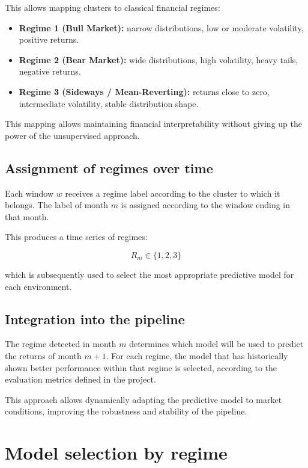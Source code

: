 \documentclass[12pt]{article}
\begin{document}
This allows mapping clusters to classical financial regimes:

\begin{itemize}
    \item \textbf{Regime 1 (Bull Market):} narrow distributions, low or moderate volatility, positive returns.
    \item \textbf{Regime 2 (Bear Market):} wide distributions, high volatility, heavy tails, negative returns.
    \item \textbf{Regime 3 (Sideways / Mean-Reverting):} returns close to zero, intermediate volatility, stable distribution shape.
\end{itemize}

This mapping allows maintaining financial interpretability without giving up the power of the unsupervised approach.

\subsection{Assignment of regimes over time}

Each window $w$ receives a regime label according to the cluster to which it belongs.  
The label of month $m$ is assigned according to the window ending in that month.

This produces a time series of regimes:



\[
R_m \in \{1, 2, 3\}
\]



which is subsequently used to select the most appropriate predictive model for each environment.

\subsection{Integration into the pipeline}

The regime detected in month $m$ determines which model will be used to predict the returns of month $m+1$. For each regime, the model that has historically shown better performance within that regime is selected, according to the evaluation metrics defined in the project.

This approach allows dynamically adapting the predictive model to market conditions, improving the robustness and stability of the pipeline.

\section{Model selection by regime}
\end{document}
